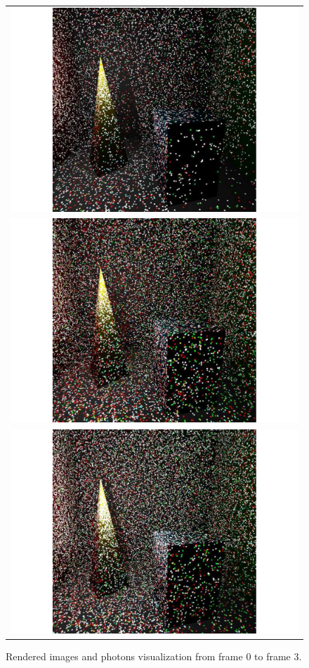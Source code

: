 \begin{figure}
\begin{center}
{\begin{tabular}{c}
\includegraphics*[scale=0.25]{imgs/pqv_frame1.pdf}\\
\includegraphics*[scale=0.25]{imgs/pqv_frame2.pdf}\\
\includegraphics*[scale=0.25]{imgs/pqv_frame3.pdf}
\end{tabular}
}%
\renewcommand{\thefigure}{\thechapter.\arabic{figure}}
\caption[Rendered images and photons visualization from frame 0 to frame 3]{Rendered images and photons visualization from frame 0 to frame 3.}
\label{fig:result_images1}
\end{center} 
\end{figure}

